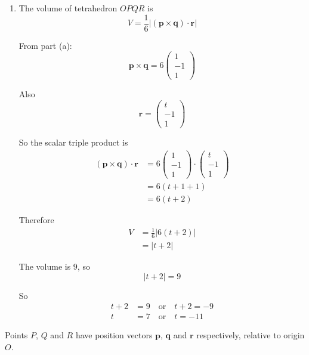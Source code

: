 \documentclass[leqno]{article}
\begin{document}
\begin{enumerate}[
  label=\textbf{\arabic*.},
  leftmargin=*,
  topsep=0pt,
  partopsep=0pt,
  parsep=0pt
]
\begin{djsSolution}
\begin{enumerate}[label=\textbf{(\alph*)}]
Comparing components gives $t=1$.

  \item The volume of tetrahedron $OPQR$ is
\[
V=\frac16\left|(\mathbf p\times \mathbf q)\cdot \mathbf r\right|
\]

From part (a):
\[
\mathbf p\times \mathbf q=6\begin{pmatrix}1\\-1\\1\end{pmatrix}
\]

Also
\[
\mathbf r=\begin{pmatrix}t\\-1\\1\end{pmatrix}
\]

So the scalar triple product is
\begin{align*}
(\mathbf p\times \mathbf q)\cdot \mathbf r
&=6\begin{pmatrix}1\\-1\\1\end{pmatrix}\cdot\begin{pmatrix}t\\-1\\1\end{pmatrix} \\
&=6(t+1+1) \\
&=6(t+2)
\end{align*}

Therefore
\begin{align*}
V
&=\frac16|6(t+2)| \\
&=|t+2|
\end{align*}

The volume is $9$, so
\[
|t+2|=9
\]

So
\begin{align*}
t+2&=9 \quad \text{or} \quad t+2=-9 \\
t&=7 \quad \text{or} \quad t=-11
\end{align*}
\end{enumerate}
\end{djsSolution}


\newpage

\questionitem

Points $P$, $Q$ and $R$ have position vectors $\mathbf{p}$, $\mathbf{q}$ and $\mathbf{r}$ respectively, relative to origin $O$. \\


\end{enumerate}
\end{document}
